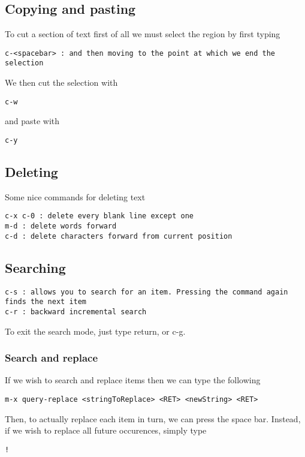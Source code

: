 \documentclass[a4paper, 10pt]{article}
\begin{document}
\subsection*{Copying and pasting}
To cut a section of text first of all we must select the region by first typing
\begin{verbatim}
c-<spacebar> : and then moving to the point at which we end the selection
\end{verbatim}
We then cut the selection with 
\begin{verbatim}
c-w
\end{verbatim}
and paste with 
\begin{verbatim}
c-y
\end{verbatim}

\subsection{Deleting}
\label{sec:deleting}

Some nice commands for deleting text
\begin{verbatim}
c-x c-0 : delete every blank line except one
m-d : delete words forward
c-d : delete characters forward from current position
\end{verbatim}

\subsection{Searching}
\label{sec:searching}

\begin{verbatim}
c-s : allows you to search for an item. Pressing the command again
finds the next item
c-r : backward incremental search
\end{verbatim}
To exit the search mode, just type return, or c-g.

\subsubsection{Search and replace}
\label{sec:search-replace}

If we wish to search and replace items then we can type the following
\begin{verbatim}
m-x query-replace <stringToReplace> <RET> <newString> <RET>
\end{verbatim}
Then, to actually replace each item in turn, we can press the space
bar. Instead, if we wish to replace all future occurences, simply type 
\begin{verbatim}
!
\end{verbatim}
\end{document}
